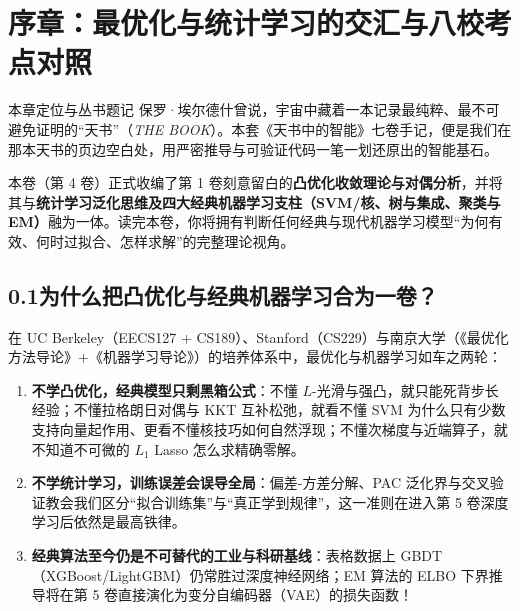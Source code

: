 \chapter*{序章：最优化与统计学习的交汇与八校考点对照}


\begin{chapIntro}{本章定位与丛书题记}
保罗·埃尔德什曾说，宇宙中藏着一本记录最纯粹、最不可避免证明的“天书”（\emph{THE BOOK}）。本套《天书中的智能》七卷手记，便是我们在那本天书的页边空白处，用严密推导与可验证代码一笔一划还原出的智能基石。

本卷（第 4 卷）正式收编了第 1 卷刻意留白的\textbf{凸优化收敛理论与对偶分析}，并将其与\textbf{统计学习泛化思维及四大经典机器学习支柱（SVM/核、树与集成、聚类与 EM）}融为一体。读完本卷，你将拥有判断任何经典与现代机器学习模型“为何有效、何时过拟合、怎样求解”的完整理论视角。
\end{chapIntro}

\section*{0.1\quad 为什么把凸优化与经典机器学习合为一卷？}

在 UC Berkeley（EECS127 + CS189）、Stanford（CS229）与南京大学（《最优化方法导论》+《机器学习导论》）的培养体系中，最优化与机器学习如车之两轮：
\begin{enumerate}
  \item \textbf{不学凸优化，经典模型只剩黑箱公式}：不懂 $L$-光滑与强凸，就只能死背步长经验；不懂拉格朗日对偶与 KKT 互补松弛，就看不懂 SVM 为什么只有少数支持向量起作用、更看不懂核技巧如何自然浮现；不懂次梯度与近端算子，就不知道不可微的 $L_1$ Lasso 怎么求精确零解。
  \item \textbf{不学统计学习，训练误差会误导全局}：偏差-方差分解、PAC 泛化界与交叉验证教会我们区分“拟合训练集”与“真正学到规律”，这一准则在进入第 5 卷深度学习后依然是最高铁律。
  \item \textbf{经典算法至今仍是不可替代的工业与科研基线}：表格数据上 GBDT（XGBoost/LightGBM）仍常胜过深度神经网络；EM 算法的 ELBO 下界推导将在第 5 卷直接演化为变分自编码器（VAE）的损失函数！
\end{enumerate}

